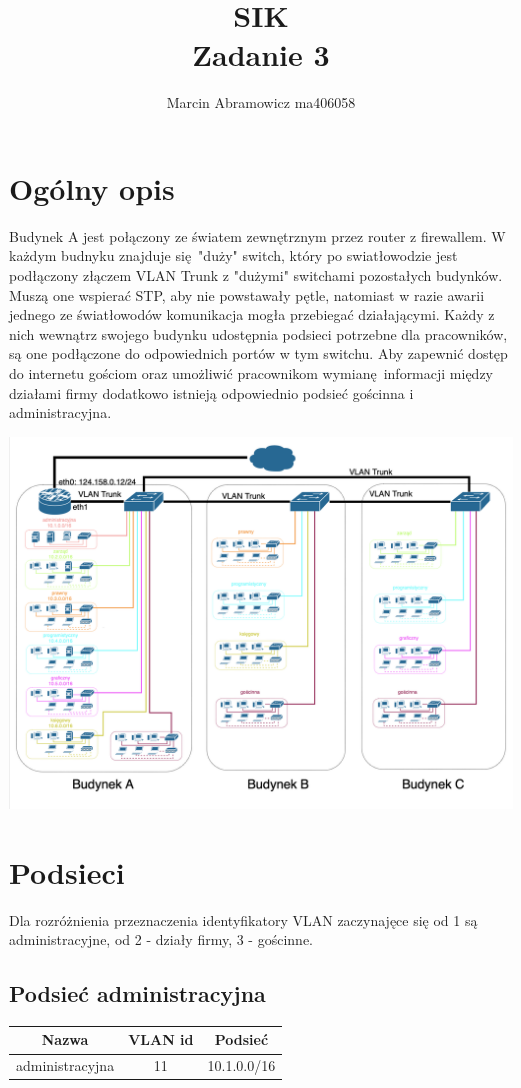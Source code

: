 \documentclass{article}
\title{SIK\\Zadanie 3}
\author{Marcin Abramowicz ma406058}
\begin{document}
  \maketitle

  \section{Ogólny opis}
    Budynek A jest połączony ze światem zewnętrznym przez router z firewallem. W każdym budnyku znajduje się "duży" switch, który po swiatłowodzie jest podłączony złączem VLAN Trunk z "dużymi" switchami pozostałych budynków. Muszą one wspierać STP, aby nie powstawały pętle, natomiast w razie awarii jednego ze światłowodów komunikacja mogła przebiegać działającymi. Każdy z nich wewnątrz swojego budynku udostępnia podsieci potrzebne dla pracowników, są one podłączone do odpowiednich portów w tym switchu. Aby zapewnić dostęp do internetu gościom oraz umożliwić pracownikom wymianę informacji między działami firmy dodatkowo istnieją odpowiednio podsieć gościnna i administracyjna.

    \centerline{\includegraphics[width=\paperwidth,keepaspectratio]{schemat-sieci}}


  \section{Podsieci}
    Dla rozróżnienia przeznaczenia identyfikatory VLAN zaczynajęce się od 1 są administracyjne, od 2 - działy firmy, 3 - gościnne.
    \subsection{Podsieć administracyjna}
      \begin{tabular}{|c|c|c|}
        Nazwa & VLAN id & Podsieć \\
        \hline
        \textcolor{kolorAdministracyjna}{administracyjna} & \textcolor{kolorAdministracyjna}{11} & \textcolor{kolorAdministracyjna}{10.1.0.0/16} \\
      \end{tabular}
\end{document}
